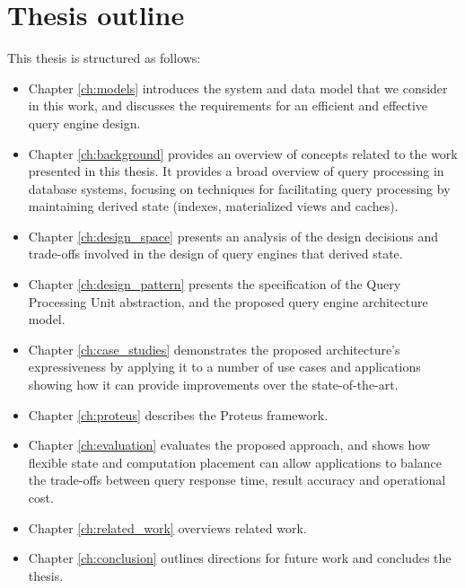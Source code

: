 \section{Thesis outline}

This thesis is structured as follows:

\begin{itemize}

  \item Chapter \ref{ch:models} introduces the system and data model that we consider in this work,
  and discusses the requirements for an efficient and effective query engine design.

  \item Chapter \ref{ch:background} provides an overview of concepts related to the work presented in this thesis.
  It provides a broad overview of query processing in database systems,
  focusing on techniques for facilitating query processing by maintaining derived state (indexes, materialized views and caches).

  \item Chapter \ref{ch:design_space} presents an analysis of the design decisions and trade-offs involved in the design
  of query engines that derived state.

  \item Chapter \ref{ch:design_pattern} presents the specification of the Query Processing Unit abstraction,
  and the proposed query engine architecture model.

  \item Chapter \ref{ch:case_studies} demonstrates the proposed architecture's expressiveness by applying it to a number
  of use cases and applications showing how it can provide improvements over the state-of-the-art.

  \item Chapter \ref{ch:proteus} describes the Proteus framework.

  \item Chapter \ref{ch:evaluation} evaluates the proposed approach,
  and shows how flexible state and computation placement can allow applications to balance the trade-offs between
  query response time, result accuracy and operational cost.

  \item Chapter \ref{ch:related_work} overviews related work.

  \item Chapter \ref{ch:conclusion} outlines directions for future work and concludes the thesis.
\end{itemize}

